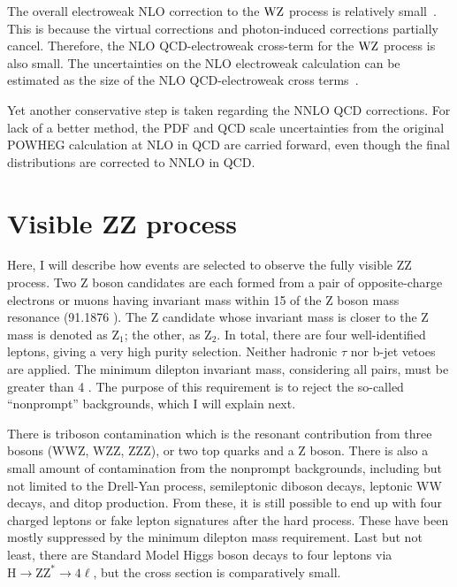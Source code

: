 The overall electroweak NLO correction to the $\mathrm{W}\mathrm{Z}$ process is relatively small~\cite{Bierweiler:2013dja,Gieseke:2014gka,Baglio:113005}.
This is because the virtual corrections and photon-induced corrections partially cancel.
Therefore, the NLO QCD-electroweak cross-term for the $\mathrm{W}\mathrm{Z}$ process is also small.
The uncertainties on the NLO electroweak calculation can be estimated as the size of the NLO QCD-electroweak cross terms~\cite{Manohar:2016nzj,Alwall:2014hca,Frixione:2014qaa,Frixione:2015zaa}.


Yet another conservative step is taken regarding the NNLO QCD corrections.
For lack of a better method, the PDF and QCD scale uncertainties from the original POWHEG calculation at NLO in QCD are carried forward,
even though the final distributions are corrected to NNLO in QCD.

\clearpage
\section{Visible ZZ process}
\label{sec:zz4l}
Here, I will describe how events are selected to observe the fully visible ZZ process.
Two Z boson candidates are each formed from a pair of opposite-charge electrons or muons having invariant mass within 15 \GeV of the Z boson mass resonance (91.1876 \GeV).
The Z candidate whose invariant mass is closer to the Z mass is denoted as $\mathrm{Z}_1$; the other, as $\mathrm{Z}_2$.
In total, there are four well-identified leptons, giving a very high purity selection.
Neither hadronic $\tau$ nor b-jet vetoes are applied.
The minimum dilepton invariant mass, considering all pairs, must be greater than 4 \GeV.
The purpose of this requirement is to reject the so-called ``nonprompt'' backgrounds, which I will explain next.

There is triboson contamination which is the resonant contribution from three bosons (WWZ, WZZ, ZZZ), or two top quarks and a Z boson.
There is also a small amount of contamination from the nonprompt backgrounds,
including but not limited to the Drell-Yan process, semileptonic diboson decays, leptonic WW decays, and ditop production.
From these, it is still possible to end up with four charged leptons or fake lepton signatures after the hard process.
These have been mostly suppressed by the minimum dilepton mass requirement.
Last but not least, there are Standard Model Higgs boson decays to four leptons
via $\mathrm{H}\rightarrow \mathrm{ZZ^*} \rightarrow 4\ell$, 
but the cross section is comparatively small.

